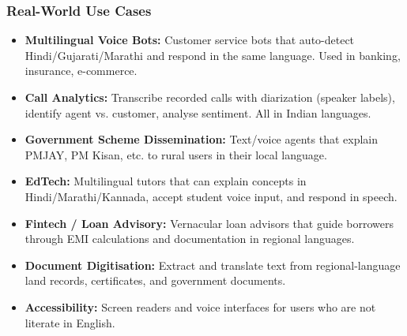 \begin{frame}[fragile]\frametitle{Real-World Use Cases}
  \begin{itemize}
    \item \textbf{Multilingual Voice Bots:} Customer service bots that auto-detect Hindi/Gujarati/Marathi and respond in the same language. Used in banking, insurance, e-commerce.

    \item \textbf{Call Analytics:} Transcribe recorded calls with diarization (speaker labels), identify agent vs. customer, analyse sentiment. All in Indian languages.

    \item \textbf{Government Scheme Dissemination:} Text/voice agents that explain PMJAY, PM Kisan, etc. to rural users in their local language.

    \item \textbf{EdTech:} Multilingual tutors that can explain concepts in Hindi/Marathi/Kannada, accept student voice input, and respond in speech.

    \item \textbf{Fintech / Loan Advisory:} Vernacular loan advisors that guide borrowers through EMI calculations and documentation in regional languages.

    \item \textbf{Document Digitisation:} Extract and translate text from regional-language land records, certificates, and government documents.

    \item \textbf{Accessibility:} Screen readers and voice interfaces for users who are not literate in English.
  \end{itemize}
\end{frame}

